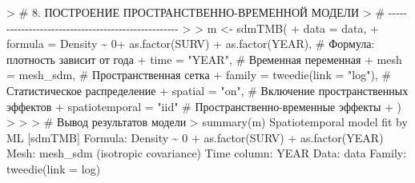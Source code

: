 \documentclass[
  letterpaper,
  DIV=11,
  numbers=noendperiod]{scrreprt}
\newenvironment{Shaded}{\begin{snugshade}}{\end{snugshade}}
\newcommand{\AttributeTok}[1]{\textcolor[rgb]{0.40,0.45,0.13}{#1}}
\newcommand{\CommentTok}[1]{\textcolor[rgb]{0.37,0.37,0.37}{#1}}
\newcommand{\DecValTok}[1]{\textcolor[rgb]{0.68,0.00,0.00}{#1}}
\newcommand{\ErrorTok}[1]{\textcolor[rgb]{0.68,0.00,0.00}{#1}}
\newcommand{\FunctionTok}[1]{\textcolor[rgb]{0.28,0.35,0.67}{#1}}
\newcommand{\NormalTok}[1]{\textcolor[rgb]{0.00,0.23,0.31}{#1}}
\newcommand{\OtherTok}[1]{\textcolor[rgb]{0.00,0.23,0.31}{#1}}
\newcommand{\SpecialCharTok}[1]{\textcolor[rgb]{0.37,0.37,0.37}{#1}}
\newcommand{\StringTok}[1]{\textcolor[rgb]{0.13,0.47,0.30}{#1}}
\begin{document}
\begin{Shaded}
\begin{Highlighting}[]
\SpecialCharTok{\textgreater{}} \CommentTok{\# 8. ПОСТРОЕНИЕ ПРОСТРАНСТВЕННО{-}ВРЕМЕННОЙ МОДЕЛИ}
\ErrorTok{\textgreater{}} \CommentTok{\# {-}{-}{-}{-}{-}{-}{-}{-}{-}{-}{-}{-}{-}{-}{-}{-}{-}{-}{-}{-}{-}{-}{-}{-}{-}{-}{-}{-}{-}{-}{-}{-}{-}{-}{-}{-}{-}{-}{-}{-}{-}{-}{-}{-}{-}{-}{-}{-}{-}{-}{-}}
\ErrorTok{\textgreater{}} 
\ErrorTok{\textgreater{}}\NormalTok{ m }\OtherTok{\textless{}{-}} \FunctionTok{sdmTMB}\NormalTok{(}
\SpecialCharTok{+}   \AttributeTok{data =}\NormalTok{ data, }
\SpecialCharTok{+}   \AttributeTok{formula =}\NormalTok{ Density }\SpecialCharTok{\textasciitilde{}} \DecValTok{0}\SpecialCharTok{+} \FunctionTok{as.factor}\NormalTok{(SURV) }\SpecialCharTok{+} \FunctionTok{as.factor}\NormalTok{(YEAR),  }\CommentTok{\# Формула: плотность зависит от года}
\SpecialCharTok{+}   \AttributeTok{time =} \StringTok{"YEAR"}\NormalTok{,         }\CommentTok{\# Временная переменная}
\SpecialCharTok{+}   \AttributeTok{mesh =}\NormalTok{ mesh\_sdm,       }\CommentTok{\# Пространственная сетка}
\SpecialCharTok{+}   \AttributeTok{family =} \FunctionTok{tweedie}\NormalTok{(}\AttributeTok{link =} \StringTok{"log"}\NormalTok{),  }\CommentTok{\# Статистическое распределение}
\SpecialCharTok{+}   \AttributeTok{spatial =} \StringTok{"on"}\NormalTok{,        }\CommentTok{\# Включение пространственных эффектов}
\SpecialCharTok{+}   \AttributeTok{spatiotemporal =} \StringTok{"iid"} \CommentTok{\# Пространственно{-}временные эффекты}
\SpecialCharTok{+}\NormalTok{ )}
\SpecialCharTok{\textgreater{}} 
\ErrorTok{\textgreater{}} 
\ErrorTok{\textgreater{}} \CommentTok{\# Вывод результатов модели}
\ErrorTok{\textgreater{}} \FunctionTok{summary}\NormalTok{(m)}
\NormalTok{Spatiotemporal model fit by ML [}\StringTok{\textquotesingle{}sdmTMB\textquotesingle{}}\NormalTok{]}
\NormalTok{Formula}\SpecialCharTok{:}\NormalTok{ Density }\SpecialCharTok{\textasciitilde{}} \DecValTok{0} \SpecialCharTok{+} \FunctionTok{as.factor}\NormalTok{(SURV) }\SpecialCharTok{+} \FunctionTok{as.factor}\NormalTok{(YEAR)}
\NormalTok{Mesh}\SpecialCharTok{:} \FunctionTok{mesh\_sdm}\NormalTok{ (isotropic covariance)}
\NormalTok{Time column}\SpecialCharTok{:}\NormalTok{ YEAR}
\NormalTok{Data}\SpecialCharTok{:}\NormalTok{ data}
\NormalTok{Family}\SpecialCharTok{:} \FunctionTok{tweedie}\NormalTok{(}\AttributeTok{link =} \StringTok{\textquotesingle{}log\textquotesingle{}}\NormalTok{)}
 

\end{Highlighting}
\end{Shaded}
\end{document}
